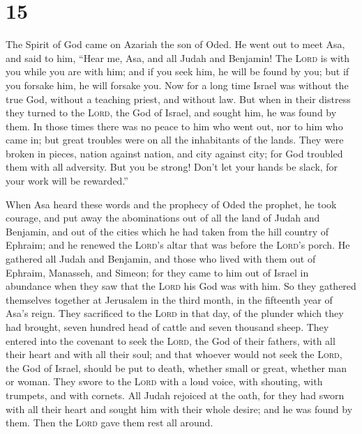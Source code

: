 \hypertarget{section-14}{%
\section{15}\label{section-14}}

 The Spirit of God came on Azariah the son of Oded.
 He went out to meet Asa, and said to him, ``Hear me, Asa,
and all Judah and Benjamin! The \textsc{Lord} is with you while you are
with him; and if you seek him, he will be found by you; but if you
forsake him, he will forsake you.  Now for a long time
Israel was without the true God, without a teaching priest, and without
law.  But when in their distress they turned to the
\textsc{Lord}, the God of Israel, and sought him, he was found by them.
 In those times there was no peace to him who went out,
nor to him who came in; but great troubles were on all the inhabitants
of the lands.  They were broken in pieces, nation against
nation, and city against city; for God troubled them with all adversity.
 But you be strong! Don't let your hands be slack, for
your work will be rewarded.''

 When Asa heard these words and the prophecy of Oded the
prophet, he took courage, and put away the abominations out of all the
land of Judah and Benjamin, and out of the cities which he had taken
from the hill country of Ephraim; and he renewed the \textsc{Lord}'s
altar that was before the \textsc{Lord}'s porch.  He
gathered all Judah and Benjamin, and those who lived with them out of
Ephraim, Manasseh, and Simeon; for they came to him out of Israel in
abundance when they saw that the \textsc{Lord} his God was with him.
 So they gathered themselves together at Jerusalem in the
third month, in the fifteenth year of Asa's reign.  They
sacrificed to the \textsc{Lord} in that day, of the plunder which they
had brought, seven hundred head of cattle and seven thousand sheep.
 They entered into the covenant to seek the
\textsc{Lord}, the God of their fathers, with all their heart and with
all their soul;  and that whoever would not seek the
\textsc{Lord}, the God of Israel, should be put to death, whether small
or great, whether man or woman.  They swore to the
\textsc{Lord} with a loud voice, with shouting, with trumpets, and with
cornets.  All Judah rejoiced at the oath, for they had
sworn with all their heart and sought him with their whole desire; and
he was found by them. Then the \textsc{Lord} gave them rest all around.

